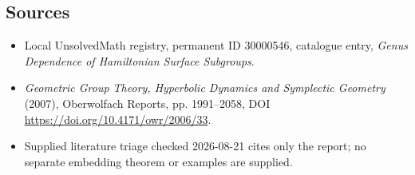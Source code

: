 \documentclass[11pt]{article}
\begin{document}
\subsection{Sources}
\begin{itemize}
\item Local UnsolvedMath registry, permanent ID 30000546, catalogue entry, \emph{Genus Dependence of Hamiltonian Surface Subgroups}.
\item \emph{Geometric Group Theory, Hyperbolic Dynamics and Symplectic Geometry} (2007), Oberwolfach Reports, pp. 1991--2058, DOI \url{https://doi.org/10.4171/owr/2006/33}.
\item Supplied literature triage checked 2026-08-21 cites only the report; no separate embedding theorem or examples are supplied.
\end{itemize}
\end{document}
